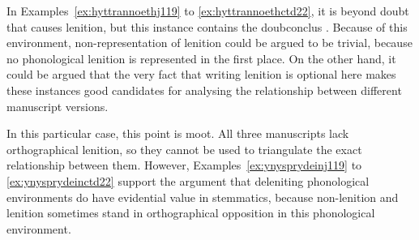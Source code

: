 


In Examples~\ref{ex:hyttrannoethj119} to \ref{ex:hyttrannoethctd22}, it is beyond doubt that  causes lenition, but this instance contains the \gls{doubconclus} . Because of this environment, non-representation of lenition could be argued to be trivial, because  no phonological lenition is represented in the first place. On the other hand, it could be argued that the very fact that writing lenition is optional here makes these instances good candidates for analysing the relationship between different manuscript versions.
\begin{mwl}
\end{mwl}
In this particular case, this point is moot. All three manuscripts lack orthographical lenition, so they cannot be used to triangulate the exact relationship between them. However, Examples~\ref{ex:ynysprydeinj119} to \ref{ex:ynysprydeinctd22}  support the argument that deleniting phonological environments do have evidential value in stemmatics, because non-lenition and lenition sometimes stand in orthographical opposition in this phonological environment.

